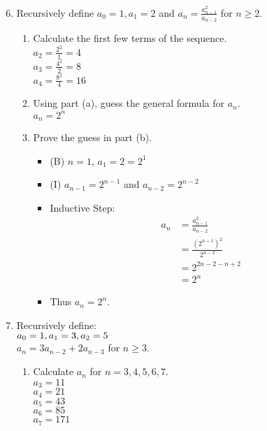 \documentclass[12pt]{article}
\newcommand{\paren}[1]{\left(#1\right)}
\begin{document}
\begin{enumerate}
\setcounter{enumi}{5}
\item Recursively define $a_0=1,a_1=2$ and $a_n=\frac{a_{n-1}^2}{a_{n-2}}$ for $n\geq2$.
	\begin{enumerate}
	\item Calculate the first few terms of the sequence.\\
	$a_2=\frac{2^2}{1}=4$\\
	$a_3=\frac{4^2}{2}=8$\\
	$a_4=\frac{8^2}{4}=16$
	\item Using part (a), guess the general formula for $a_n$.\\
	$a_n=2^n$
	\item Prove the guess in part (b).
		\begin{itemize}
		\item (B) $n=1$, $a_1=2=2^1$
		\item (I) $a_{n-1}=2^{n-1}$ and $a_{n-2}=2^{n-2}$
		\item Inductive Step:
			\begin{align*}
			a_n &= \frac{a_{n-1}^2}{a_{n-2}}  \\
			&= \frac{\paren{2^{n-1}}^2}{2^{n-2}}\\
			&= 2^{2n-2-n+2}\\
			&= 2^n
			\end{align*}
		\item Thus $a_n=2^n$.
		\end{itemize}
	\end{enumerate}

\setcounter{enumi}{11}
\item Recursively define:\\
	$a_0=1,\\
	a_1=3,\\
	a_2=5$ \\
	$a_n=3a_{n-2}+2a_{n-3}$ for $n\geq3$.
	
	\begin{enumerate}
	\item Calculate $a_n$ for $n=3,4,5,6,7$.\\
	$a_3=11$\\
	$a_4=21$\\
	$a_5=43$\\
	$a_6=85$\\
	$a_7=171$
	

\end{enumerate}
\end{enumerate}
\end{document}
